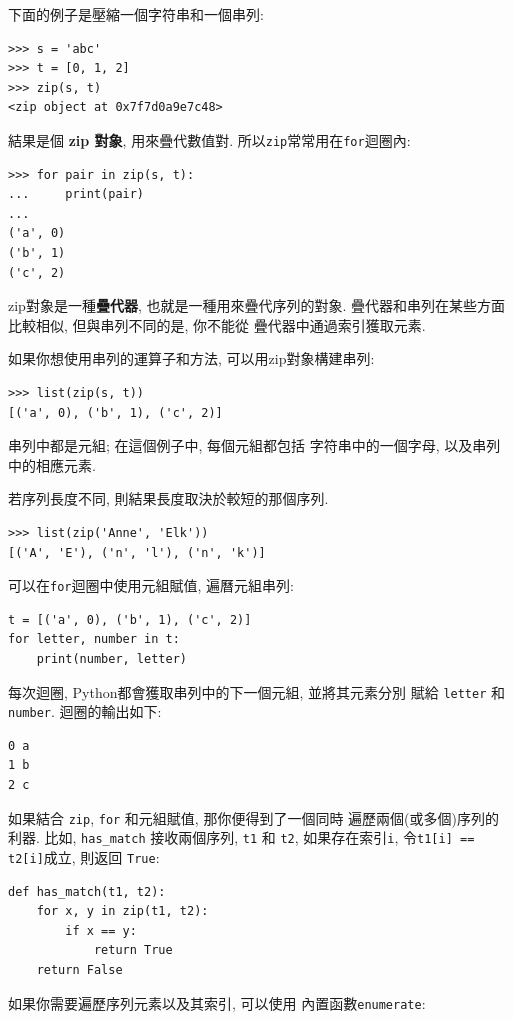 \documentclass[10pt]{book}
\begin{document}
下面的例子是壓縮一個字符串和一個串列:

\begin{verbatim}
>>> s = 'abc'
>>> t = [0, 1, 2]
>>> zip(s, t)
<zip object at 0x7f7d0a9e7c48>
\end{verbatim}
%
結果是個 {\bf zip 對象}, 用來疊代數值對. 
所以{\tt zip}常常用在{\tt for}迴圈內:

\begin{verbatim}
>>> for pair in zip(s, t):
...     print(pair)
...
('a', 0)
('b', 1)
('c', 2)
\end{verbatim}
%

zip對象是一種{\bf 疊代器}, 也就是一種用來疊代序列的對象. 
疊代器和串列在某些方面比較相似, 但與串列不同的是, 你不能從
疊代器中通過索引獲取元素. 

如果你想使用串列的運算子和方法, 可以用zip對象構建串列:

\begin{verbatim}
>>> list(zip(s, t))
[('a', 0), ('b', 1), ('c', 2)]
\end{verbatim}
%
串列中都是元組; 在這個例子中, 每個元組都包括
字符串中的一個字母, 以及串列中的相應元素. 

若序列長度不同, 則結果長度取決於較短的那個序列. 

\begin{verbatim}
>>> list(zip('Anne', 'Elk'))
[('A', 'E'), ('n', 'l'), ('n', 'k')]
\end{verbatim}
%
可以在{\tt for}迴圈中使用元組賦值, 遍曆元組串列:

\begin{verbatim}
t = [('a', 0), ('b', 1), ('c', 2)]
for letter, number in t:
    print(number, letter)
\end{verbatim}
%
每次迴圈, Python都會獲取串列中的下一個元組, 並將其元素分別
賦給 {\tt letter} 和 {\tt number}. 
迴圈的輸出如下:

\begin{verbatim}
0 a
1 b
2 c
\end{verbatim}
%
如果結合 {\tt zip}, {\tt for} 和元組賦值, 那你便得到了一個同時
遍歷兩個(或多個)序列的利器. 比如, \verb"has_match" 接收兩個序列, 
{\tt t1} 和 {\tt t2}, 如果存在索引{\tt i}, 令{\tt t1[i] == t2[i]}成立, 
則返回 {\tt True}:

\begin{verbatim}
def has_match(t1, t2):
    for x, y in zip(t1, t2):
        if x == y:
            return True
    return False
\end{verbatim}
%
如果你需要遍歷序列元素以及其索引, 可以使用
內置函數{\tt enumerate}:
\end{document}
